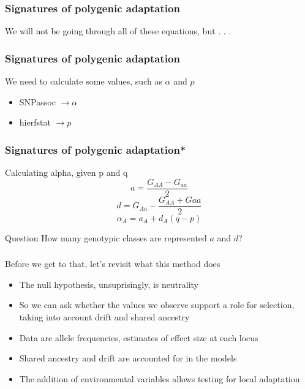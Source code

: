 \begin{frame}
\frametitle{Signatures of polygenic adaptation}
\begin{block}{}
\centering
We will not be going through all of these equations, but . . .
\end{block}
\tiny
\citet[Figure 1]{Berg:2014bs}
\end{frame}

\begin{frame}
\frametitle{Signatures of polygenic adaptation}
\begin{block}{We need to calculate some values, such as $\alpha$ and $p$}
\centering
\begin{itemize}
\item{SNPassoc $\longrightarrow \alpha$}
\item{hierfstat $\longrightarrow p$}
\end{itemize}
\end{block}
\end{frame}

\begin{frame}
\frametitle{Signatures of polygenic adaptation*}
\begin{block}{Calculating alpha, given p and q}
\centering
\begin{equation}
a = \frac{G_{AA} - G_{aa}}{2}	
\end{equation}
\begin{equation}
d = G_{Aa} - \frac{G_{AA}+G{aa}}{2}	
\end{equation}
\begin{equation}
\alpha_A = a_A + d_A(q-p)	
\end{equation}
\end{block}
\tiny
\citet{Cheverud:2015tc}
\normalsize
\begin{block}{Question}
How many genotypic classes are represented  $a$ and $d$?
\end{block}

\end{frame}

\begin{frame}
\frametitle{}
\begin{block}{Before we get to that, let's revisit what this method does}
\begin{itemize}
\item{The null hypothesis, unsuprisingly, is neutrality}
\item{So we can ask whether the values we observe support a role for selection,
taking into account drift and shared ancestry}
\item{Data are allele frequencies, estimates of effect size at each locus}
\item{Shared ancestry and drift are accounted for in the models}
\item{The addition of environmental variables allows testing for local
adaptation}
\end{itemize}
\end{block}
\end{frame}

